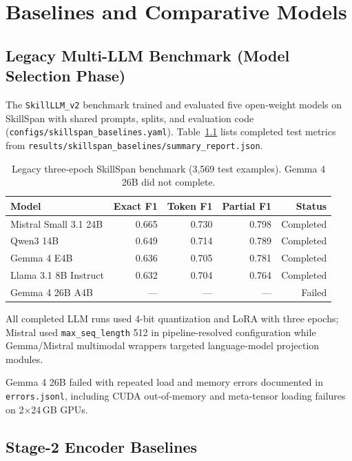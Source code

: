 \chapter{Baselines and Comparative Models}
\label{ch:baselines}

\section{Legacy Multi-LLM Benchmark (Model Selection Phase)}

The \texttt{SkillLLM\_v2} benchmark trained and evaluated five open-weight models on SkillSpan with shared prompts, splits, and evaluation code (\texttt{configs/skillspan\_baselines.yaml}).
Table~\ref{tab:legacy-llm} lists completed test metrics from \texttt{results/skillspan\_baselines/summary\_report.json}.

\begin{table}[htbp]
  \centering
  \caption{Legacy three-epoch SkillSpan benchmark (3{,}569 test examples). Gemma 4 26B did not complete.}
  \label{tab:legacy-llm}
  \begin{tabular}{lrrrr}
    \toprule
    Model & Exact F1 & Token F1 & Partial F1 & Status \\
    \midrule
    Mistral Small 3.1 24B & 0.665 & 0.730 & 0.798 & Completed \\
    Qwen3 14B            & 0.649 & 0.714 & 0.789 & Completed \\
    Gemma 4 E4B           & 0.636 & 0.705 & 0.781 & Completed \\
    Llama 3.1 8B Instruct & 0.632 & 0.704 & 0.764 & Completed \\
    Gemma 4 26B A4B       & ---   & ---   & ---   & Failed \\
    \bottomrule
  \end{tabular}
\end{table}

All completed LLM runs used 4-bit quantization and LoRA with three epochs; Mistral used \texttt{max\_seq\_length} 512 in pipeline-resolved configuration while Gemma/Mistral multimodal wrappers targeted language-model projection modules.

Gemma 4 26B failed with repeated load and memory errors documented in \texttt{errors.jsonl}, including CUDA out-of-memory and meta-tensor loading failures on 2$\times$24\,GB GPUs.

\section{Stage-2 Encoder Baselines}

